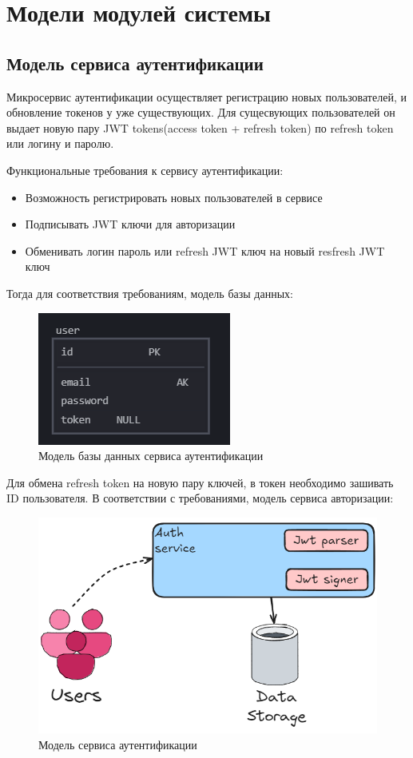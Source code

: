 \section{Модели модулей системы}
\subsection{Модель сервиса аутентификации}

Микросервис аутентификации осуществляет регистрацию новых пользователей, и обновление токенов у уже существующих.
Для сущесвующих пользователей он выдает новую пару JWT tokens(access token + refresh token) по refresh token или логину
и паролю.

Функциональные требования к сервису аутентификации:
\begin{itemize}
  \item Возможность регистрировать новых пользователей в сервисе
  \item Подписывать JWT ключи для авторизации
  \item Обменивать логин пароль или refresh JWT ключ на новый resfresh JWT ключ
\end{itemize}

Тогда для соответствия требованиям, модель базы данных:
\begin{figure}[H]%
	\begin{center}
		\includegraphics[width=.5\columnwidth]{./img/auth_db_model.png}%
	\end{center}
	\caption{Модель базы данных сервиса аутентификации}%
	\label{pic:auth_db}%
\end{figure}


Для обмена refresh token на новую пару ключей, в токен необходимо зашивать ID пользователя.
В соответствии с требованиями, модель сервиса авторизации:
\begin{figure}[H]%
	\begin{center}
		\includegraphics[width=.5\columnwidth]{./img/auth_model.png}%
	\end{center}
	\caption{Модель сервиса аутентификации}%
	\label{pic:auth_model}%
\end{figure}


